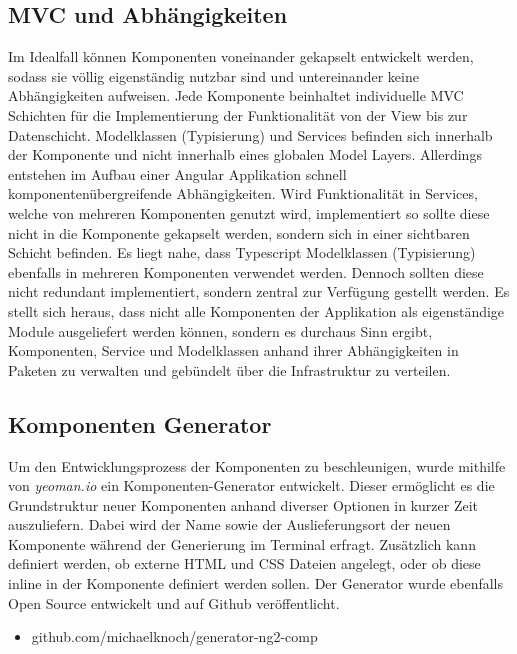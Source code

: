 \subsection{MVC und Abhängigkeiten}

Im Idealfall können Komponenten voneinander gekapselt entwickelt werden,
sodass sie völlig eigenständig nutzbar sind und untereinander keine Abhängigkeiten aufweisen.
Jede Komponente beinhaltet individuelle \ac{MVC} Schichten für die Implementierung der Funktionalität von der View bis zur Datenschicht.
Modelklassen (Typisierung) und Services befinden sich innerhalb der Komponente und nicht innerhalb eines globalen Model Layers.
Allerdings entstehen im Aufbau einer Angular Applikation schnell komponentenübergreifende Abhängigkeiten.
Wird Funktionalität in Services, welche von mehreren Komponenten genutzt wird, implementiert
so sollte diese nicht in die Komponente gekapselt werden, sondern sich in einer sichtbaren Schicht befinden.
Es liegt nahe, dass Typescript Modelklassen (Typisierung) ebenfalls in mehreren Komponenten verwendet werden.
Dennoch sollten diese nicht redundant implementiert,
sondern zentral zur Verfügung gestellt werden. Es stellt sich heraus,
dass nicht alle Komponenten der Applikation \projectname{} als eigenständige Module ausgeliefert werden können,
sondern es durchaus Sinn ergibt, Komponenten, Service und Modelklassen anhand ihrer Abhängigkeiten in Paketen zu verwalten und
gebündelt über die Infrastruktur zu verteilen.


\subsection{Komponenten Generator}

Um den Entwicklungsprozess der Komponenten zu beschleunigen, wurde mithilfe von \emph{yeoman.io} ein Komponenten-Generator entwickelt.
Dieser ermöglicht es die Grundstruktur neuer Komponenten anhand diverser Optionen in kurzer Zeit auszuliefern.
Dabei wird der Name sowie der Auslieferungsort der neuen Komponente während der Generierung im Terminal erfragt.
Zusätzlich kann definiert werden, ob externe \ac{HTML} und \ac{CSS} Dateien angelegt, oder ob diese inline in der Komponente definiert werden sollen.
Der Generator wurde ebenfalls Open Source entwickelt und auf Github veröffentlicht.

\begin{itemize}
\item github.com/michaelknoch/generator-ng2-comp
\end{itemize}


